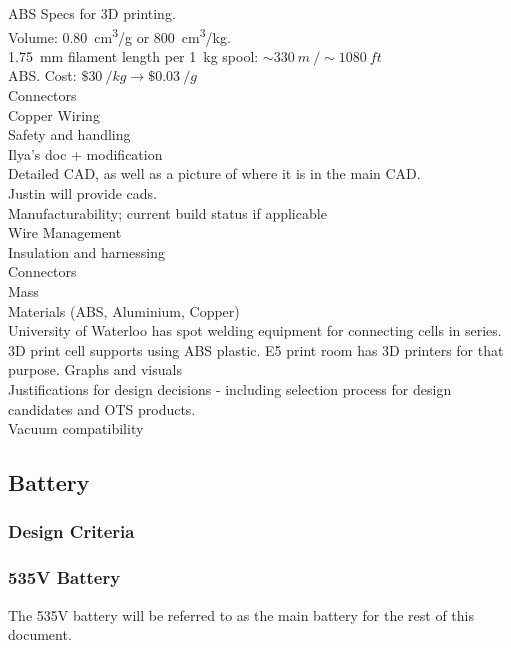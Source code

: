 \documentclass{report}
\begin{document}
    ABS Specs for 3D printing.\\
    Volume: \SI{0.80}{cm^3/g} or \SI{800}{cm^3/kg}.\\
    \SI{1.75}{mm} filament length per \SI{1}{kg} spool: $\sim \SI{330}{m}\ / \sim \SI{1080}{ft}$\\
    ABS. Cost: $\$\SI{30}{/kg} \rightarrow \$\SI{0.03}{/g}$\\
    
    Connectors\\
    
    Copper Wiring\\
    
    
    
    
    Safety and handling\\
    Ilya’s doc + modification\\
    Detailed CAD, as well as a picture of where it is in the main CAD.\\
    Justin will provide cads. \\
    Manufacturability; current build status if applicable\\
    Wire Management\\
    Insulation and harnessing\\
    Connectors\\
    Mass \\
    Materials (ABS, Aluminium, Copper)\\
    
    
    University of Waterloo has spot welding equipment for connecting cells in series.
    3D print cell supports using ABS plastic. E5 print room has 3D printers for that purpose.
    Graphs and visuals\\
    
    Justifications for design decisions - including selection process for design candidates and OTS products.\\
    
    Vacuum compatibility\\
    
    \subsection{Battery}
    \subsubsection{Design Criteria}
    \subsubsection{535V Battery}
    The 535V battery will be referred to as the main battery for the rest of this document.\\
    
\end{document}
